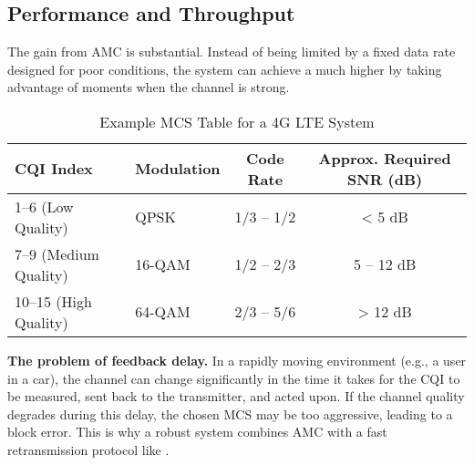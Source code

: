\subsection{Performance and Throughput}

The gain from AMC is substantial. Instead of being limited by a fixed data rate designed for poor conditions, the system can achieve a much higher  by taking advantage of moments when the channel is strong.

\begin{table}[H]
    \centering
    \caption{Example MCS Table for a 4G LTE System}
    \label{tab:mcs-table}
    \begin{tabularx}{\textwidth}{@{}XXcc@{}}
        \toprule
        \tableheaderfont CQI Index & \tableheaderfont Modulation & \tableheaderfont Code Rate & \tableheaderfont Approx. Required SNR (dB) \\
        \midrule
        1--6 (Low Quality) & QPSK & 1/3 -- 1/2 & < 5 dB \\
        7--9 (Medium Quality) & 16-QAM & 1/2 -- 2/3 & 5 -- 12 dB \\
        10--15 (High Quality) & 64-QAM & 2/3 -- 5/6 & > 12 dB \\
        \bottomrule
    \end{tabularx}
\end{table}

\begin{warningbox}
    \textbf{The problem of feedback delay.} In a rapidly moving environment (e.g., a user in a car), the channel can change significantly in the time it takes for the CQI to be measured, sent back to the transmitter, and acted upon. If the channel quality degrades during this delay, the chosen MCS may be too aggressive, leading to a block error. This is why a robust system combines AMC with a fast retransmission protocol like .
\end{warningbox}


